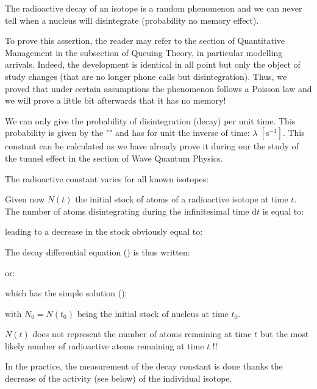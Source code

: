 	The radioactive decay of an isotope is a random phenomenon and we can never tell when a nucleus will disintegrate (probability no memory effect).
	
	\begin{tcolorbox}[title=Remark,colframe=black,arc=10pt]
	To prove this assertion, the reader may refer to the section of Quantitative Management in the subsection of Queuing Theory, in particular modelling arrivals. Indeed, the development is identical in all point but only the object of study changes (that are no longer phone calls but disintegration). Thus, we proved that under certain assumptions the phenomenon follows a Poisson law and we will prove a little bit afterwards that it has no memory!
	\end{tcolorbox}
	We can only give the probability of disintegration (decay) per unit time. This probability is given by the "" and has for unit the inverse of time: $\lambda\; [\text{s}^{-1}]$. This constant can be calculated as we have already prove it during our the study of the tunnel effect in the section of Wave Quantum Physics.

	The radioactive constant varies for all known isotopes:
	
	Given now $N (t)$ the initial stock of atoms of a radioactive isotope at time $t$. The number of atoms disintegrating during the infinitesimal time $\mathrm{d}t$ is equal to:
	
	leading to a decrease in the stock obviously equal to:
	
	The decay differential equation () is thus written:
	
	or:
	
	which has the simple solution ():
	
	with $N_0=N(t_0)$ being the initial stock of nucleus at time $t_0$. 
	
	\begin{tcolorbox}[title=Remark,colframe=black,arc=10pt]
	$N(t)$ does not represent the number of atoms remaining at time $t$ but the most likely number of radioactive atoms remaining at time $t$ !!
	\end{tcolorbox}
	
	In the practice, the measurement of the decay constant is done thanks the decrease of the activity (see below) of the individual isotope.
	
